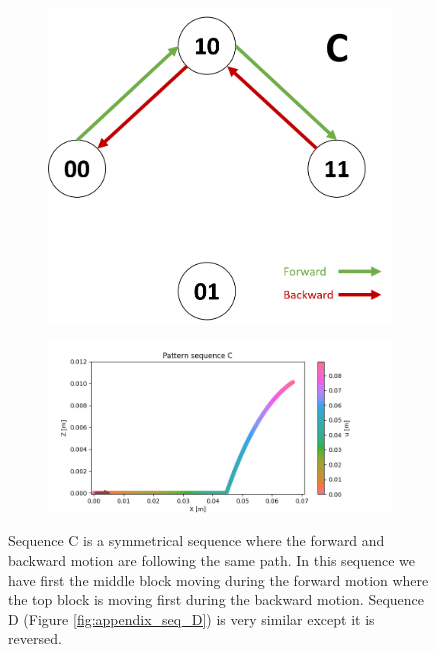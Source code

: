         
        \begin{figure}[h]
            \centering
            \begin{subfigure}{.2\textwidth}
            \includegraphics[width=\textwidth]{images/S_C.png}
            \end{subfigure}%
            \begin{subfigure}{.6\textwidth}
            \includegraphics[width=\textwidth]{images/C.png}
            \end{subfigure}
            \caption{Sequence C is a symmetrical sequence where the forward and backward motion are following the same path. In this sequence we have first the middle block moving during the forward motion where the top block is moving first during the backward motion. Sequence D (Figure \ref{fig:appendix_seq_D}) is very similar except it is reversed.}
        \end{figure}
        
